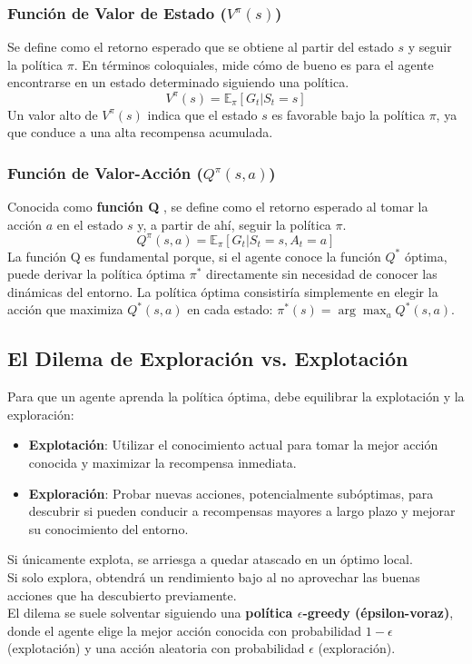 \documentclass[12pt,a4paper]{book}
\begin{document}
\subsubsection{Función de Valor de Estado ($V^{\pi}(s)$)}
Se define como el retorno esperado que se obtiene al partir del estado $s$ y seguir la política $\pi$. En términos coloquiales, mide cómo de bueno es para el agente encontrarse en un estado determinado siguiendo una política.
\[ V^{\pi}(s) = \mathbb{E}_{\pi}[G_t | S_t = s] \]
Un valor alto de $V^{\pi}(s)$ indica que el estado $s$ es favorable bajo la política $\pi$, ya que conduce a una alta recompensa acumulada.


\subsubsection{Función de Valor-Acción ($Q^{\pi}(s, a)$)}
Conocida como \textbf{función Q} \cite{q-learning}, se define como el retorno esperado al tomar la acción $a$ en el estado $s$ y, a partir de ahí, seguir la política $\pi$.
\[ Q^{\pi}(s, a) = \mathbb{E}_{\pi}[G_t | S_t = s, A_t = a] \]
La función Q es fundamental porque, si el agente conoce la función $Q^*$ óptima, puede derivar la política óptima $\pi^*$ directamente sin necesidad de conocer las dinámicas del entorno. La política óptima consistiría simplemente en elegir la acción que maximiza $Q^*(s, a)$ en cada estado: $\pi^*(s) = \arg\max_a Q^*(s, a)$.

\hrulefill

\subsection{El Dilema de Exploración vs. Explotación}

Para que un agente aprenda la política óptima, debe equilibrar la explotación y la exploración:
\begin{itemize}
    \item \textbf{Explotación}: Utilizar el conocimiento actual para tomar la mejor acción conocida y maximizar la recompensa inmediata.
    \item \textbf{Exploración}: Probar nuevas acciones, potencialmente subóptimas, para descubrir si pueden conducir a recompensas mayores a largo plazo y mejorar su conocimiento del entorno.
\end{itemize}
Si únicamente explota, se arriesga a quedar atascado en un óptimo local.\\
Si solo explora, obtendrá un rendimiento bajo al no aprovechar las buenas acciones que ha descubierto previamente.\\
El dilema se suele solventar siguiendo una \textbf{política $\epsilon$-greedy (épsilon-voraz)}, donde el agente elige la mejor acción conocida con probabilidad $1-\epsilon$ (explotación) y una acción aleatoria con probabilidad $\epsilon$ (exploración).
\end{document}
